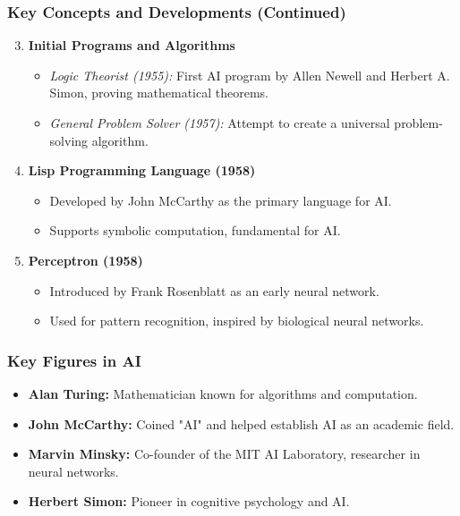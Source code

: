 \documentclass[aspectratio=169]{beamer}
\begin{document}
\begin{frame}[fragile]
    \frametitle{Key Concepts and Developments (Continued)}
    \begin{enumerate}
        \setcounter{enumi}{2} %
        \item \textbf{Initial Programs and Algorithms}
            \begin{itemize}
                \item \textit{Logic Theorist (1955):} First AI program by Allen Newell and Herbert A. Simon, proving mathematical theorems.
                \item \textit{General Problem Solver (1957):} Attempt to create a universal problem-solving algorithm.
            \end{itemize}
        \item \textbf{Lisp Programming Language (1958)}
            \begin{itemize}
                \item Developed by John McCarthy as the primary language for AI.
                \item Supports symbolic computation, fundamental for AI.
            \end{itemize}
        \item \textbf{Perceptron (1958)}
            \begin{itemize}
                \item Introduced by Frank Rosenblatt as an early neural network.
                \item Used for pattern recognition, inspired by biological neural networks.
            \end{itemize}
    \end{enumerate}
\end{frame}

\begin{frame}[fragile]
    \frametitle{Key Figures in AI}
    \begin{itemize}
        \item \textbf{Alan Turing:} Mathematician known for algorithms and computation.
        \item \textbf{John McCarthy:} Coined "AI" and helped establish AI as an academic field.
        \item \textbf{Marvin Minsky:} Co-founder of the MIT AI Laboratory, researcher in neural networks.
        \item \textbf{Herbert Simon:} Pioneer in cognitive psychology and AI.
    \end{itemize}
\end{frame}
\end{document}
